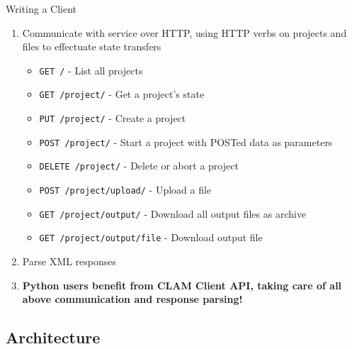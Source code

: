 \documentclass[compress]{beamer}
\begin{document}
\begin{frame}
    \begin{block}{Writing a Client}
        \begin{enumerate}
            \item Communicate with service over HTTP, using HTTP verbs on projects and files to effectuate state transfers 
            \begin{itemize}
                \item \texttt{GET /} - List all projects
                \item \texttt{GET /project/} - Get a project's state
                \item \texttt{PUT /project/} - Create a project
                \item \texttt{POST /project/} - Start a project with POSTed data as parameters
                \item \texttt{DELETE /project/} - Delete or abort a project
                \item \texttt{POST /project/upload/} - Upload a file
                \item \texttt{GET /project/output/} - Download all output files as archive
                \item \texttt{GET /project/output/file} - Download output file
            \end{itemize}
            \item Parse XML responses
            \item \textbf{Python users benefit from CLAM Client API, taking care of all above communication and response parsing!}
        \end{enumerate}
    \end{block}

\end{frame}


\subsection{Architecture}
\end{document}

